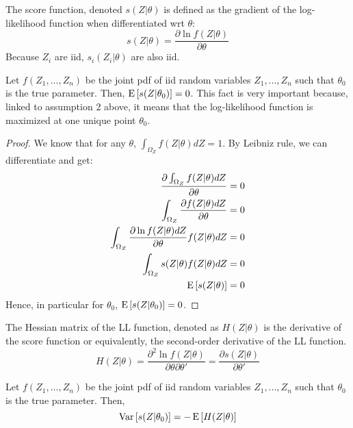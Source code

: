 \begin{definition}
The score function, denoted $s(Z\vert\theta)$ is defined as the gradient of the log-likelihood function when differentiated wrt $\theta$:$$ s(Z\vert\theta) = \frac{\partial \ln f(Z\vert \theta)}{\partial \theta} $$Because $Z_i$ are iid, $s_i(Z_i\vert\theta)$ are also iid.
\end{definition}

\begin{remark}
Let $f(Z_1, ..., Z_n)$ be the joint pdf of iid random variables $Z_1, ..., Z_n$ such that $\theta_0$ is the true parameter. Then, $\operatorname{E}\left[s(Z\vert\theta_0)\right]=0$. This fact is very important because, linked to assumption 2 above, it means that the log-likelihood function is maximized at one unique point $\theta_0$.
\end{remark}

\begin{proof}
We know that for any $\theta$, $\int_{\Omega_Z} f(Z\vert\theta)dZ = 1$. By Leibniz rule, we can differentiate and get:\begin{align*}
\frac{\partial \int_{\Omega_Z} f(Z\vert\theta)dZ}{\partial \theta} & = 0 \\ \int_{\Omega_Z} \frac{\partial f(Z\vert\theta)dZ}{\partial \theta} & = 0 \\ \int_{\Omega_Z} \frac{\partial \ln f(Z\vert\theta)dZ}{\partial \theta} f(Z\vert\theta)dZ  & = 0 \\ \int_{\Omega_Z} s(Z\vert\theta) f(Z\vert\theta)dZ  & = 0 \\ \operatorname{E}\left[s(Z\vert\theta)\right]&=0
\end{align*} Hence, in particular for $\theta_0$, $\operatorname{E}\left[s(Z\vert\theta_0)\right]=0$.
\end{proof}

\begin{definition}
The Hessian matrix of the LL function, denoted as $H(Z\vert\theta)$ is the derivative of the score function or equivalently, the second-order derivative of the LL function. $$H(Z\vert\theta) = \frac{\partial^2 \ln f(Z\vert \theta)}{\partial \theta\partial\theta'} = \frac{\partial s(Z\vert \theta)}{\partial\theta'}$$
\end{definition}

\begin{remark}
Let $f(Z_1, ..., Z_n)$ be the joint pdf of iid random variables $Z_1, ..., Z_n$ such that $\theta_0$ is the true parameter. Then, $$\operatorname{Var}\left[s(Z\vert\theta_0)\right]=-\operatorname{E}\left[H(Z\vert\theta)\right]$$
\end{remark}

